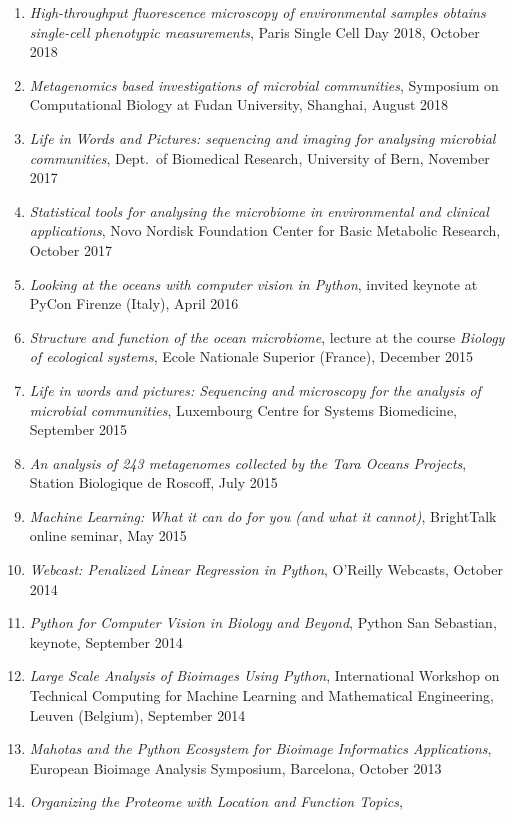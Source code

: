 \documentclass{article}
\begin{document}
\begin{enumerate}
{    gut microbiome} at ICOHAR, April 2019
\item \emph{High-throughput fluorescence microscopy of environmental samples
    obtains single-cell phenotypic measurements}, Paris Single Cell Day 2018,
    October 2018
\item \emph{Metagenomics based investigations of microbial communities},
    Symposium on Computational Biology at Fudan University, Shanghai, August
    2018
\item \emph{Life in Words and Pictures: sequencing and imaging for analysing
    microbial communities}, Dept.\ of Biomedical Research, University of Bern,
    November 2017
\item \emph{Statistical tools for analysing the microbiome in environmental and
    clinical applications}, Novo Nordisk Foundation Center for Basic Metabolic
    Research, October 2017
\item \emph{Looking at the oceans with computer vision in Python}, invited
    keynote at PyCon Firenze (Italy), April 2016
\item \emph{Structure and function of the ocean microbiome}, lecture at the
    course \textit{Biology of ecological systems}, Ecole Nationale Superior
    (France), December 2015
\item \emph{Life in words and pictures: Sequencing and microscopy for the analysis
    of microbial communities}, Luxembourg Centre for Systems Biomedicine,
    September 2015
\item \emph{An analysis of 243 metagenomes collected by the Tara Oceans
    Projects}, Station Biologique de Roscoff, July 2015
\item \emph{Machine Learning: What it can do for you (and what it cannot)},
    BrightTalk online seminar, May 2015
\item \emph{Webcast: Penalized Linear Regression in Python}, O'Reilly Webcasts,
    October 2014
\item \emph{Python for Computer Vision in Biology and Beyond}, Python San
    Sebastian, keynote, September 2014
\item \emph{Large Scale Analysis of Bioimages Using Python}, International
    Workshop on Technical Computing for Machine Learning and Mathematical
    Engineering, Leuven (Belgium), September 2014
\item \emph{Mahotas and the Python Ecosystem for Bioimage Informatics
Applications}, European Bioimage Analysis Symposium, Barcelona, October 2013
\item \emph{Organizing the Proteome with Location and Function Topics},

\end{enumerate}
\end{document}
